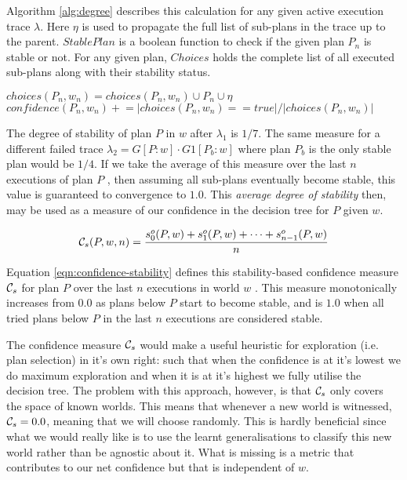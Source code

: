 
Algorithm \ref{alg:degree} describes this calculation for any given active execution trace $\lambda$. Here $\eta$ is used to propagate the full list of sub-plans in the trace up to the parent. $StablePlan$ is a boolean function to check if the given plan $P_n$ is stable or not. For any given plan, $Choices$ holds the complete list of all executed sub-plans along with their stability status.

\begin{algorithm}[ht]
$choices(P_n,w_n) = choices(P_n,w_n) \cup P_n \cup \eta$\;
$confidence(P_n,w_n) +\!\!= |choices(P_n,w_n) == true|/|choices(P_n,w_n)|$\;
\caption{$UpdateConfidence(\lambda, \eta, k, \epsilon)$}
\label{alg:degree}
\end{algorithm}

The degree of stability of plan $P$ in $w$ after $\lambda_1$ is $1/7$. The same measure for a different failed trace $\lambda_2=G[P:w] \cdot G1[P_b:w]$ where plan $P_b$ is the only stable plan would be $1/4$. If we take the average of this measure over the last $n$ executions of plan $P$ , then assuming all sub-plans eventually become stable, this value is guaranteed to convergence to $1.0$. This {\em average degree of stability} then, may be used as a measure of our confidence in the decision tree for $P$ given $w$. 

\begin{equation}
{\ensuremath{\mathcal{C}}}_s(P,w,n) = \frac{s^o_0(P,w) + s^o_1(P,w) + \cdots + s^o_{n-1}(P,w)}{n}
\label{eqn:confidence-stability}
\end{equation}

Equation \ref{eqn:confidence-stability} defines this stability-based confidence measure ${\mathcal{C}}_s$ for plan $P$ over the last $n$ executions in world $w$ . This measure monotonically increases from $0.0$ as plans below $P$ start to become stable, and is $1.0$ when all tried plans below $P$ in the last $n$ executions are considered stable. 

The confidence measure ${\mathcal{C}}_s$ would make a useful heuristic for exploration (i.e. plan selection) in it's own right: such that when the confidence is at it's lowest we do maximum exploration and when it is at it's highest we fully utilise the decision tree. The problem with this approach, however, is that ${\mathcal{C}}_s$ only covers the space of known worlds. This means that whenever a new world is witnessed, ${\mathcal{C}}_s=0.0$, meaning that we will choose randomly. This is hardly beneficial since what we would really like is to use the learnt generalisations to classify this new world rather than be agnostic about it. What is missing is a metric that contributes to our net confidence but that is independent of $w$.

